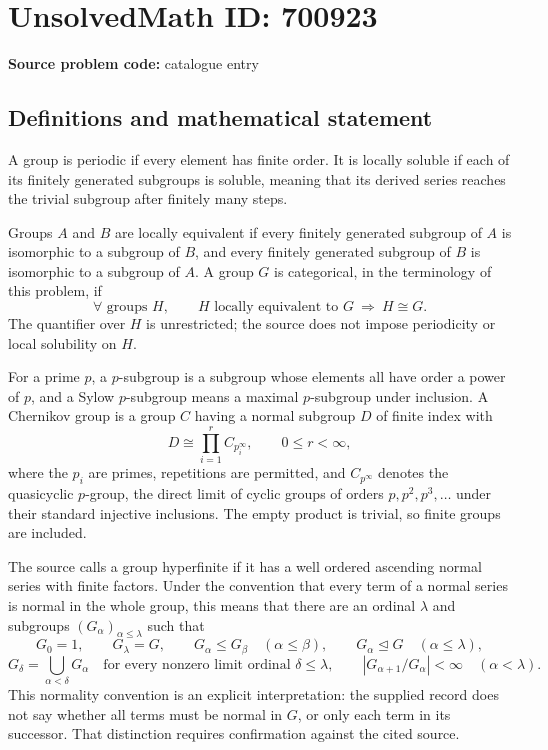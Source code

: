\documentclass[11pt]{article}
\begin{document}
\section*{UnsolvedMath ID: 700923}
\textbf{Source problem code:} catalogue entry
\subsection{Definitions and mathematical statement}
A group is periodic if every element has finite order. It is locally soluble if each of its finitely generated subgroups is soluble, meaning that its derived series reaches the trivial subgroup after finitely many steps.

Groups \(A\) and \(B\) are locally equivalent if every finitely generated subgroup of \(A\) is isomorphic to a subgroup of \(B\), and every finitely generated subgroup of \(B\) is isomorphic to a subgroup of \(A\). A group \(G\) is categorical, in the terminology of this problem, if
\[
\forall\text{ groups }H,\qquad H\text{ locally equivalent to }G\ \Longrightarrow\ H\cong G.
\]
The quantifier over \(H\) is unrestricted; the source does not impose periodicity or local solubility on \(H\).

For a prime \(p\), a \(p\)-subgroup is a subgroup whose elements all have order a power of \(p\), and a Sylow \(p\)-subgroup means a maximal \(p\)-subgroup under inclusion. A Chernikov group is a group \(C\) having a normal subgroup \(D\) of finite index with
\[
D\cong\prod_{i=1}^{r} C_{p_i^\infty},\qquad 0\leq r<\infty,
\]
where the \(p_i\) are primes, repetitions are permitted, and \(C_{p^\infty}\) denotes the quasicyclic \(p\)-group, the direct limit of cyclic groups of orders \(p,p^2,p^3,\ldots\) under their standard injective inclusions. The empty product is trivial, so finite groups are included.

The source calls a group hyperfinite if it has a well ordered ascending normal series with finite factors. Under the convention that every term of a normal series is normal in the whole group, this means that there are an ordinal \(\lambda\) and subgroups \((G_\alpha)_{\alpha\leq\lambda}\) such that
\[
G_0=1,\qquad G_\lambda=G,\qquad
G_\alpha\leq G_\beta\quad(\alpha\leq\beta),\qquad
G_\alpha\trianglelefteq G\quad(\alpha\leq\lambda),
\]
\[
G_\delta=\bigcup_{\alpha<\delta}G_\alpha
\quad\text{for every nonzero limit ordinal }\delta\leq\lambda,
\qquad
|G_{\alpha+1}/G_\alpha|<\infty\quad(\alpha<\lambda).
\]
This normality convention is an explicit interpretation: the supplied record does not say whether all terms must be normal in \(G\), or only each term in its successor. That distinction requires confirmation against the cited source.
\end{document}
